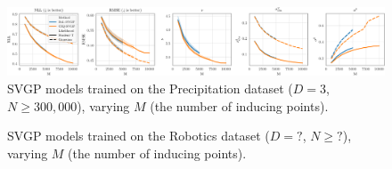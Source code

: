 \begin{figure}[t!]
  \centering
  \includegraphics[width=\linewidth]{figures/precip.pdf}
  \caption{
    SVGP models trained on the Precipitation dataset ($D=3$, $N\geq300,\!000$), varying $M$ (the number of inducing points).
  }
  \label{fig:precip}
\end{figure}

\begin{figure}[t!]
  \centering
  \caption{
    SVGP models trained on the Robotics dataset ($D=?$, $N\geq?$), varying $M$ (the number of inducing points).
  }
  \label{fig:robotics}
\end{figure}
